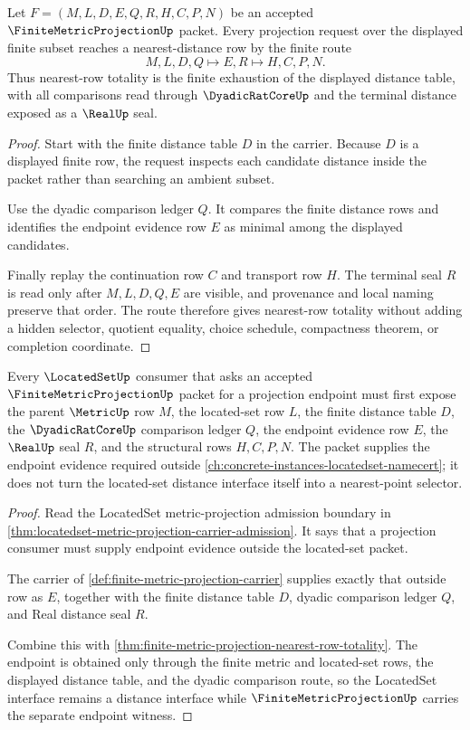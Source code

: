 \begin{theorem}
\label{thm:finite-metric-projection-nearest-row-totality}
Let $F=(M,L,D,E,Q,R,H,C,P,N)$ be an accepted $\FiniteMetricProjectionUp$ packet. Every projection request over the displayed finite subset reaches a nearest-distance row by the finite route
$$
M,L,D,Q \longmapsto E,R \longmapsto H,C,P,N .
$$
Thus nearest-row totality is the finite exhaustion of the displayed distance table, with all comparisons read through $\DyadicRatCoreUp$ and the terminal distance exposed as a $\RealUp$ seal.
\end{theorem}
\begin{proof}
Start with the finite distance table $D$ in the carrier. Because $D$ is a displayed finite row, the request inspects each candidate distance inside the packet rather than searching an ambient subset.

Use the dyadic comparison ledger $Q$. It compares the finite distance rows and identifies the endpoint evidence row $E$ as minimal among the displayed candidates.

Finally replay the continuation row $C$ and transport row $H$. The terminal seal $R$ is read only after $M,L,D,Q,E$ are visible, and provenance and local naming preserve that order. The route therefore gives nearest-row totality without adding a hidden selector, quotient equality, choice schedule, compactness theorem, or completion coordinate.
\end{proof}

\begin{theorem}
\label{thm:finite-metric-projection-locatedset-route}
Every $\LocatedSetUp$ consumer that asks an accepted $\FiniteMetricProjectionUp$ packet for a projection endpoint must first expose the parent $\MetricUp$ row $M$, the located-set row $L$, the finite distance table $D$, the $\DyadicRatCoreUp$ comparison ledger $Q$, the endpoint evidence row $E$, the $\RealUp$ seal $R$, and the structural rows $H,C,P,N$. The packet supplies the endpoint evidence required outside \autoref{ch:concrete-instances-locatedset-namecert}; it does not turn the located-set distance interface itself into a nearest-point selector.
\end{theorem}
\begin{proof}
Read the LocatedSet metric-projection admission boundary in \autoref{thm:locatedset-metric-projection-carrier-admission}. It says that a projection consumer must supply endpoint evidence outside the located-set packet.

The carrier of \autoref{def:finite-metric-projection-carrier} supplies exactly that outside row as $E$, together with the finite distance table $D$, dyadic comparison ledger $Q$, and Real distance seal $R$.

Combine this with \autoref{thm:finite-metric-projection-nearest-row-totality}. The endpoint is obtained only through the finite metric and located-set rows, the displayed distance table, and the dyadic comparison route, so the LocatedSet interface remains a distance interface while $\FiniteMetricProjectionUp$ carries the separate endpoint witness.
\end{proof}

